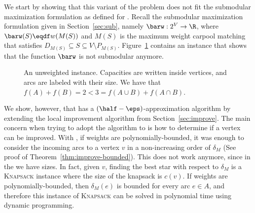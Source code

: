 We start by showing that this variant of the problem does not fit the
submodular maximization formulation as defined for \carpool.
%
Recall the submodular maximization formulation given in
Section~\ref{sec:sub}, namely $\barw: 2^V \to \R$, where
$\barw(S) \eqdf w(M(S))$ and $M(S)$ is the maximum weight carpool
matching that satisfies $D_{M(S)} \subseteq S \subseteq V \setminus
P_{M(S)}$.
%
Figure~\ref{fig:not submodular} contains an instance that shows that
the function $\barw$ is not submodular anymore.

\begin{figure}
\begin{center}
\end{center}
\caption[Carpool - Not submodular]{An unweighted \carpool instance.  Capacities are written
  inside vertices, and arcs are labeled with their size.  We have that
  $f(A) + f(B) = 2 < 3 = f(A \cup B) + f(A \cap B)$.}
\label{fig:not submodular}
\end{figure}

We show, however, that \gcp has a $(\half -\eps)$-approx\-imation
algorithm by extending the local improvement algorithm from
Section~\ref{sec:improve}.
%
The main concern when trying to adopt the algorithm to \gcp is how to
determine if a vertex can be improved.
%
With \carpool, if weights are polynomially-bounded, it was enough to
consider the incoming arcs to a vertex $v$ in a non-increasing
order of $\delta_M$ (See proof of Theorem~\ref{thm:improve-bounded}).
This does not work anymore, since in the \gcp we have sizes.  In fact, given
$v$, finding the best star with respect to $\delta_M$ is
a \textsc{Knapsack} instance where the size of the knapsack is $c(v)$.
%
If weights are polynomially-bounded, then $\delta_M(e)$ is bounded for
every arc $e \in A$, and therefore this instance of \textsc{Knapsack}
can be solved in polynomial time using dynamic programming.

